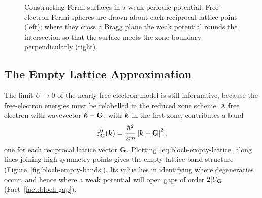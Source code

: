 \begin{figure}[ht]
\centering
{}
\caption{Constructing Fermi surfaces in a weak periodic potential. Free-electron Fermi spheres are drawn about each reciprocal lattice point (left); where they cross a Bragg plane the weak potential rounds the intersection so that the surface meets the zone boundary perpendicularly (right).}
\label{fig:bloch-fermi}
\end{figure}

\subsection{The Empty Lattice Approximation}

The limit $U\to 0$ of the nearly free electron model is still informative, because the free-electron energies must be relabelled in the reduced zone scheme. A free electron with wavevector $\lvect{k}-\cvect{G}$, with $\bm{k}$ in the first zone, contributes a band
\begin{equation}
    \varepsilon^0_{\cvect{G}}(\lvect{k}) = \frac{\hbar^2}{2m}\left|\lvect{k}-\cvect{G}\right|^2,
    \label{eq:bloch-empty-lattice}
\end{equation}
one for each reciprocal lattice vector $\cvect{G}$. Plotting~\eqref{eq:bloch-empty-lattice} along lines joining high-symmetry points gives the empty lattice band structure (Figure~\ref{fig:bloch-empty-bands}). Its value lies in identifying where degeneracies occur, and hence where a weak potential will open gaps of order $2|U_{\cvect{G}}|$ (Fact~\ref{fact:bloch-gap}).


